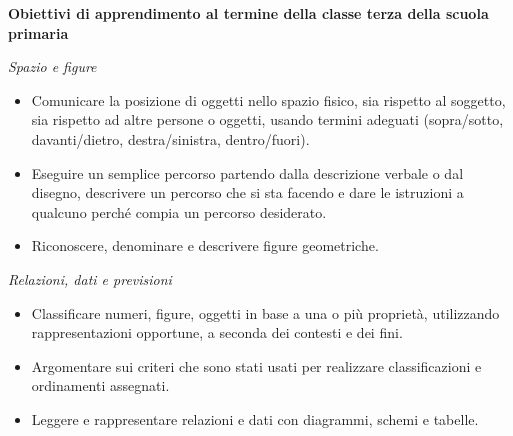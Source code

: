\documentclass[12pt]{report}
\begin{document}
\medskip
\noindent \textbf{Obiettivi di apprendimento al termine della classe terza della scuola primaria}
\begin{description}
	\item \textit{Spazio e figure}
		\begin{itemize}
			\item Comunicare la posizione di oggetti nello spazio fisico, sia rispetto al soggetto, sia rispetto ad altre persone o oggetti, usando termini adeguati (sopra/sotto, davanti/dietro, destra/sinistra, dentro/fuori).
			\item Eseguire un semplice percorso partendo dalla descrizione verbale o dal disegno, descrivere un percorso che si sta facendo e dare le istruzioni a qualcuno perché compia un percorso desiderato.
			\item Riconoscere, denominare e descrivere figure geometriche.
		\end{itemize}
\medskip
	\item \textit{Relazioni, dati e previsioni}
		\begin{itemize}
			\item Classificare numeri, figure, oggetti in base a una o più proprietà, utilizzando rappresentazioni opportune, a seconda dei contesti e dei fini.
			\item Argomentare sui criteri che sono stati usati per realizzare classificazioni e ordinamenti assegnati.
			\item Leggere e rappresentare relazioni e dati con diagrammi, schemi e tabelle.
		\end{itemize}
\end{description}
\end{document}
